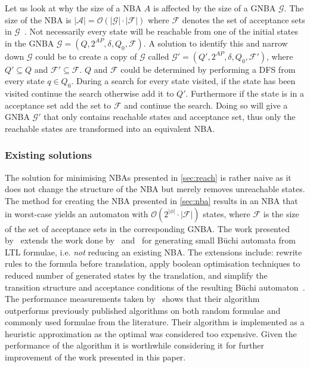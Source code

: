 Let us look at why the size of a NBA $A$ is affected by the size of a GNBA $\mathcal{G}$. The size of the NBA is $|\mathcal{A}| = \mathcal{O}(|\mathcal{G}| \cdot |\mathcal{F}|)$ where $\mathcal{F}$ denotes the set of acceptance sets in $\mathcal{G}$~\cite[thm. 4.56]{baier2008principles}. 
Not necessarily every state will be reachable from one of the initial states in the GNBA $\mathcal{G}=(Q,2^{AP},\delta,Q_0,\mathcal{F})$. A solution to identify this and narrow down $\mathcal{G}$ could be to create a copy of $\mathcal{G}$ called $\mathcal{G}'=(Q',2^{AP},\delta,Q_0,\mathcal{F}')$, where $Q' \subseteq Q$ and $\mathcal{F}' \subseteq \mathcal{F}$. $Q$ and $\mathcal{F}$ could be determined by performing a DFS from every state $q \in Q_0$. During a search for every state visited, if the state has been visited continue the search otherwise add it to $Q'$. Furthermore if the state is in a acceptance set add the set to $\mathcal{F}$ and continue the search. Doing so will give a GNBA $\mathcal{G}'$ that only contains reachable states and acceptance set, thus only the reachable states are transformed into an equivalent NBA.

\subsubsection{Existing solutions}\label{sec:existing}
The solution for minimising NBAs presented in \autoref{sec:reach} is rather naive as it does not change the structure of the NBA but merely removes unreachable states. The method for creating the NBA presented in \autoref{sec:nba} results in an NBA that in worst-case yields an automaton with $\mathcal{O}(2^{|\phi|} \cdot |\mathcal{F}|)$ states, where $\mathcal{F}$ is the size of the set of acceptance sets in the corresponding GNBA. The work presented by~\cite{somenzi2000efficient} extends the work done by~\cite{gerth1995simple} and~\cite{daniele1999improved} for generating small Büchi automata from LTL formulae, i.e. \emph{not} reducing an existing NBA. The extensions include: rewrite rules to the formula before translation, apply boolean optimisation techniques to reduced number of generated states by the translation, and simplify the transition structure and acceptance conditions of the resulting Büchi automaton~\cite{somenzi2000efficient}. The performance measurements taken by~\cite{somenzi2000efficient} shows that their algorithm outperforms previously published algorithms on both random formulae and commonly used formulae from the literature. Their algorithm is implemented as a heuristic approximation as the optimal was considered too expensive. Given the performance of the algorithm it is worthwhile considering it for further improvement of the work presented in this paper.

